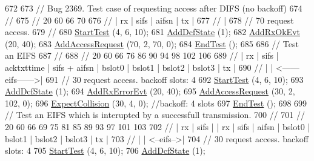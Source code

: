 \begin{DoxyCode}
672 
673   \textcolor{comment}{// Bug 2369.  Test case of requesting access after DIFS (no backoff)}
674   \textcolor{comment}{//}
675   \textcolor{comment}{//  20    60     66      70}
676   \textcolor{comment}{//   | rx  | sifs | aifsn | tx |}
677   \textcolor{comment}{//                        |}
678   \textcolor{comment}{//                       70 request access.}
679   \textcolor{comment}{//}
680   \hyperlink{classDcfManagerTest_a5e7a2ff4209e9602aea95d4efa51ae91}{StartTest} (4, 6, 10);
681   \hyperlink{classDcfManagerTest_ab48a072efc828fc250036b45c3db1832}{AddDcfState} (1);
682   \hyperlink{classDcfManagerTest_afc9e919cbe6497efb6a1b10d484de251}{AddRxOkEvt} (20, 40);
683   \hyperlink{classDcfManagerTest_a1f016026b88c036eed9ce87bfc32b71a}{AddAccessRequest} (70, 2, 70, 0);
684   \hyperlink{classDcfManagerTest_acc78df96a60d77fdb57a9f93029dca6c}{EndTest} ();
685 
686   \textcolor{comment}{// Test an EIFS}
687   \textcolor{comment}{//}
688   \textcolor{comment}{//  20          60     66           76             86       90       94       98       102   106}
689   \textcolor{comment}{//   |    rx     | sifs | acktxttime | sifs + aifsn | bslot0 | bslot1 | bslot2 | bslot3 | tx |}
690   \textcolor{comment}{//        |      | <------eifs------>|}
691   \textcolor{comment}{//       30 request access. backoff slots: 4}
692   \hyperlink{classDcfManagerTest_a5e7a2ff4209e9602aea95d4efa51ae91}{StartTest} (4, 6, 10);
693   \hyperlink{classDcfManagerTest_ab48a072efc828fc250036b45c3db1832}{AddDcfState} (1);
694   \hyperlink{classDcfManagerTest_a9e21293e0feca0c3d7b953d13c494c8d}{AddRxErrorEvt} (20, 40);
695   \hyperlink{classDcfManagerTest_a1f016026b88c036eed9ce87bfc32b71a}{AddAccessRequest} (30, 2, 102, 0);
696   \hyperlink{classDcfManagerTest_a1f78350a941a4ca0e28260c8f6390e45}{ExpectCollision} (30, 4, 0); \textcolor{comment}{//backoff: 4 slots}
697   \hyperlink{classDcfManagerTest_acc78df96a60d77fdb57a9f93029dca6c}{EndTest} ();
698 
699   \textcolor{comment}{// Test an EIFS which is interupted by a successfull transmission.}
700   \textcolor{comment}{//}
701   \textcolor{comment}{//  20          60      66  69     75     81      85       89       93       97      101  103}
702   \textcolor{comment}{//   |    rx     | sifs  |   |  rx  | sifs | aifsn | bslot0 | bslot1 | bslot2 | bslot3 | tx |}
703   \textcolor{comment}{//        |      | <--eifs-->|}
704   \textcolor{comment}{//       30 request access. backoff slots: 4}
705   \hyperlink{classDcfManagerTest_a5e7a2ff4209e9602aea95d4efa51ae91}{StartTest} (4, 6, 10);
706   \hyperlink{classDcfManagerTest_ab48a072efc828fc250036b45c3db1832}{AddDcfState} (1);

\end{DoxyCode}
